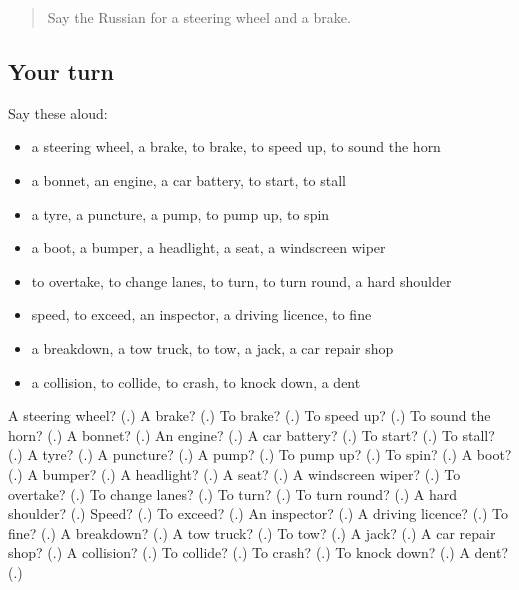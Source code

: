 \label{lesson:RU-R410-review-403-410}



\begin{quote}
Say the Russian for a steering wheel and a brake.
\end{quote}

\subsection*{Your turn}
Say these aloud:

\begin{itemize}
\raggedright
  \item a steering wheel, a brake, to brake, to speed up, to sound the horn
  \item a bonnet, an engine, a car battery, to start, to stall
  \item a tyre, a puncture, a pump, to pump up, to spin
  \item a boot, a bumper, a headlight, a seat, a windscreen wiper
  \item to overtake, to change lanes, to turn, to turn round, a hard shoulder
  \item speed, to exceed, an inspector, a driving licence, to fine
  \item a breakdown, a tow truck, to tow, a jack, a car repair shop
  \item a collision, to collide, to crash, to knock down, a dent
\end{itemize}

\begin{tcolorbox}[breakable,colback=teal!4,colframe=teal!35!black,title={Before you move on}]
A steering wheel? (\textbf{}.) A brake? (\textbf{}.) To brake? (\textbf{}.) To speed up? (\textbf{}.) To sound the horn? (\textbf{}.) A bonnet? (\textbf{}.) An engine? (\textbf{}.) A car battery? (\textbf{}.) To start? (\textbf{}.) To stall? (\textbf{}.) A tyre? (\textbf{}.) A puncture? (\textbf{}.) A pump? (\textbf{}.) To pump up? (\textbf{}.) To spin? (\textbf{}.) A boot? (\textbf{}.) A bumper? (\textbf{}.) A headlight? (\textbf{}.) A seat? (\textbf{}.) A windscreen wiper? (\textbf{}.) To overtake? (\textbf{}.) To change lanes? (\textbf{}.) To turn? (\textbf{}.) To turn round? (\textbf{}.) A hard shoulder? (\textbf{}.) Speed? (\textbf{}.) To exceed? (\textbf{}.) An inspector? (\textbf{}.) A driving licence? (\textbf{}.) To fine? (\textbf{}.) A breakdown? (\textbf{}.) A tow truck? (\textbf{}.) To tow? (\textbf{}.) A jack? (\textbf{}.) A car repair shop? (\textbf{}.) A collision? (\textbf{}.) To collide? (\textbf{}.) To crash? (\textbf{}.) To knock down? (\textbf{}.) A dent? (\textbf{}.)
\end{tcolorbox}
